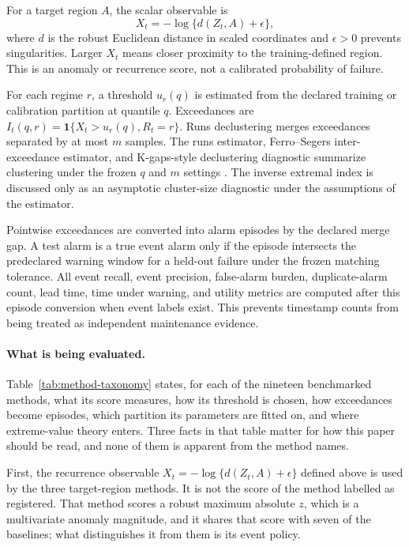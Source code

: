 For a target region \(A\), the scalar observable is
\[
    X_t=-\log\{d(Z_t,A)+\epsilon\},
\]
where \(d\) is the robust Euclidean distance in scaled coordinates and \(\epsilon>0\) prevents singularities. Larger \(X_t\) means closer proximity to the training-defined region. This is an anomaly or recurrence score, not a calibrated probability of failure.

For each regime \(r\), a threshold \(u_r(q)\) is estimated from the declared training or calibration partition at quantile \(q\). Exceedances are \(I_t(q,r)=\mathbf{1}\{X_t>u_r(q),R_t=r\}\). Runs declustering merges exceedances separated by at most \(m\) samples. The runs estimator, Ferro--Segers inter-exceedance estimator, and K-gaps-style declustering diagnostic summarize clustering under the frozen \(q\) and \(m\) settings \citep{FerroSegers2003Clusters,SuvegesDavison2010KGap}. The inverse extremal index is discussed only as an asymptotic cluster-size diagnostic under the assumptions of the estimator.

Pointwise exceedances are converted into alarm episodes by the declared merge gap. A test alarm is a true event alarm only if the episode intersects the predeclared warning window for a held-out failure under the frozen matching tolerance. All event recall, event precision, false-alarm burden, duplicate-alarm count, lead time, time under warning, and utility metrics are computed after this episode conversion when event labels exist. This prevents timestamp counts from being treated as independent maintenance evidence.

\paragraph{What is being evaluated.} Table~\ref{tab:method-taxonomy} states, for each of the nineteen benchmarked methods, what its score measures, how its threshold is chosen, how exceedances become episodes, which partition its parameters are fitted on, and where extreme-value theory enters. Three facts in that table matter for how this paper should be read, and none of them is apparent from the method names.

First, the recurrence observable \(X_t=-\log\{d(Z_t,A)+\epsilon\}\) defined above is used by the three target-region methods. It is not the score of the method labelled as registered. That method scores a robust maximum absolute \(z\), which is a multivariate anomaly magnitude, and it shares that score with seven of the baselines; what distinguishes it from them is its event policy.

